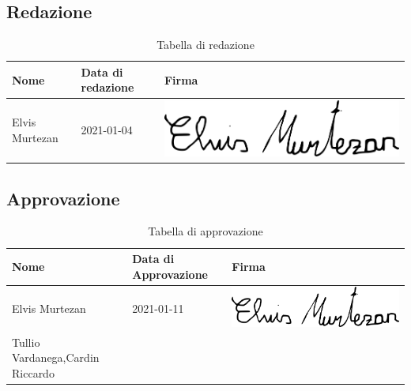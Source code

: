 \subsection{Redazione}
{
	\renewcommand{\arraystretch}{2}
	\begin{longtable}{ C{5cm} C{4cm} C{5cm} }
		\caption{Tabella di redazione}\\
		\rowcolor{\primaryColor}
        \textcolor{\secondaryColor}{\textbf{Nome}} & \textcolor{\secondaryColor}{\textbf{Data di redazione}} & \textcolor{\secondaryColor}{\textbf{Firma}}\\ \endhead        		
        {Elvis Murtezan} & 2021-01-04 & \includegraphics[scale=0.20]{./src/Organigramma/immagini/firme/Elvis.png}\\
	\end{longtable}
}

\subsection{Approvazione}
{
	\renewcommand{\arraystretch}{2}
	\centering
	\begin{longtable}{ C{5cm} C{4cm} C{5cm} }
		\caption{Tabella di approvazione}\\
		\rowcolor{\primaryColor}
        \textcolor{\secondaryColor}{\textbf{Nome}} & \textcolor{\secondaryColor}{\textbf{Data di Approvazione}} & \textcolor{\secondaryColor}{\textbf{Firma}}\\	\endhead
		{Elvis Murtezan} & 2021-01-11 & \includegraphics[scale=0.20]{./src/Organigramma/immagini/firme/Elvis.png}\\
		{Tullio Vardanega,Cardin Riccardo} &  &   \\
	\end{longtable}
}

